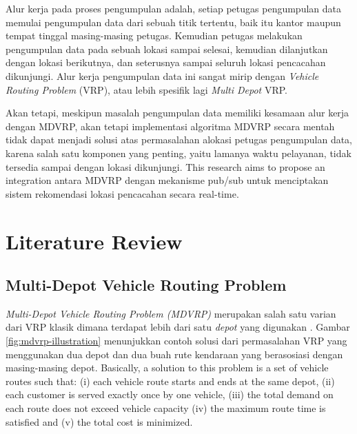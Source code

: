 \documentclass[conference]{IEEEtran}
\begin{document}
Alur kerja pada proses pengumpulan adalah, setiap petugas pengumpulan data memulai pengumpulan data dari sebuah titik tertentu, baik itu kantor maupun tempat tinggal masing-masing petugas. Kemudian petugas melakukan pengumpulan data pada sebuah lokasi sampai selesai, kemudian dilanjutkan dengan lokasi berikutnya, dan seterusnya sampai seluruh lokasi pencacahan dikunjungi. Alur kerja pengumpulan data ini sangat mirip dengan \textit{Vehicle Routing Problem} (VRP), atau lebih spesifik lagi \textit{Multi Depot} VRP.


Akan tetapi, meskipun masalah pengumpulan data memiliki kesamaan alur kerja dengan MDVRP, akan tetapi implementasi algoritma MDVRP secara mentah tidak dapat menjadi solusi atas permasalahan alokasi petugas pengumpulan data, karena salah satu komponen yang penting, yaitu lamanya waktu pelayanan, tidak tersedia sampai dengan lokasi dikunjungi. This research aims to propose an integration antara MDVRP dengan mekanisme pub/sub untuk menciptakan sistem rekomendasi lokasi pencacahan secara real-time.


\section{Literature Review}
\label{sec:literature-review}
\subsection{Multi-Depot Vehicle Routing Problem}
\label{ssec:mdvrp}
\textit{Multi-Depot Vehicle Routing Problem (MDVRP)} merupakan salah satu varian dari VRP klasik dimana terdapat lebih dari satu \textit{depot} yang digunakan \cite{montoya-torres_literature_2015}. Gambar \ref{fig:mdvrp-illustration} menunjukkan contoh solusi dari permasalahan VRP yang menggunakan dua depot dan dua buah rute kendaraan yang berasosiasi dengan masing-masing depot. Basically, a solution to this problem is a set of vehicle routes such that: (i) each vehicle route starts and ends at the same depot, (ii) each customer is served exactly once by one vehicle, (iii) the total demand on each route does not exceed vehicle capacity (iv) the maximum route time is satisfied and (v) the total cost is minimized.
\end{document}
